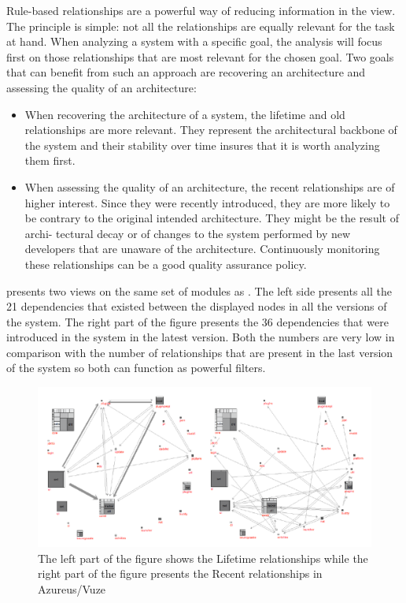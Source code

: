 \documentclass[preprint,12pt]{elsarticle}
\begin{document}
Rule-based relationships are a powerful way of reducing information in the view. The principle is simple: not all the relationships are equally relevant for the task at hand. When analyzing a system with a specific goal, the analysis will focus first on those relationships that are most relevant for the chosen goal. Two goals that can benefit from such an approach are recovering an architecture and assessing the quality of an architecture:

\begin{itemize}
\item When recovering the architecture of a system, the lifetime and old relationships are more relevant. They represent the architectural backbone of the system and their stability over time insures that it is worth analyzing them first.

\item When assessing the quality of an architecture, the recent relationships are of higher interest. Since they were recently introduced, they are more likely to be contrary to the original intended architecture. They might be the result of archi- tectural decay or of changes to the system performed by new developers that are unaware of the architecture. Continuously monitoring these relationships can be a good quality assurance policy.
\end{itemize}

 presents two views on the same set of modules as . The left side presents all the 21 dependencies that existed between the displayed nodes in all the versions of the system. The right part of the figure presents the 36 dependencies that were introduced in the system in the latest version. Both the numbers are very low in comparison with the number of relationships that are present in the last version of the system so both can function as powerful filters.

\begin{figure}[h]
\begin{center}
\includegraphics[width=0.8\linewidth]{images/Architecture-LifetimeVsRecent}
\caption{The left part of the figure shows the Lifetime relationships while the right part of the figure presents the Recent relationships in Azureus/Vuze}
\end{center}
\end{figure}
\end{document}
